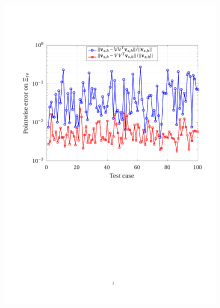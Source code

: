 \documentclass[12pt, a4paper, twoside, openright]{report}
\numberwithin{equation}{chapter}
\theoremstyle{theorem}
\theoremstyle{definition}
\theoremstyle{remark}
\theoremstyle{proposition}
\numberwithin{figure}{chapter}
\begin{document}
	\begin{figure}[H]
		\center
		\includegraphics[scale = 0.75, trim = {1.5cm 11cm 1cm 3.5cm}, clip]{dc_400_vx_pointwise_error}
	\end{figure}
	
\end{document}
